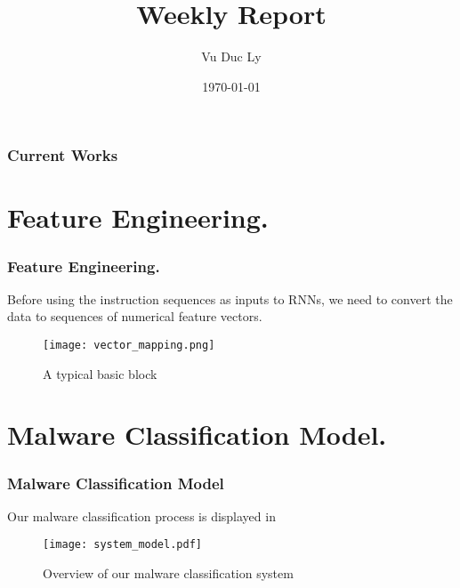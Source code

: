 \documentclass{beamer}
\title[Weekly Report]{Weekly Report } %
\author{Vu Duc Ly} %
\date{\today} %
\begin{document}
\begin{frame}
\titlepage %
\hyperlink{currentwork}{}
\end{frame}

\begin{frame}[label=currentwork]
\frametitle{Current Works} %
\tableofcontents %
\end{frame}


\section{Feature Engineering.} 
\begin{frame}[label=fe]
\frametitle{Feature Engineering.}
Before using the instruction sequences as inputs to RNNs, we need to convert the data to sequences of numerical feature vectors. 

\begin{figure}[!ht]
	\centering
	\texttt{[image: vector\_mapping.png]}
	\caption{A typical basic block}
	\label{fig:vector_mapping}
\end{figure}
\hyperlink{currentwork}{}
\hyperlink{model}{}
\end{frame}

\section{Malware Classification Model.} 
\begin{frame}[label=model]
\frametitle{Malware Classification Model}

Our malware classification process is displayed in 

\begin{figure}[!ht]
\centering
\texttt{[image: system\_model.pdf]}
\caption{Overview of our malware classification system }
\label{fig:system_model}
\end{figure}

 
\hyperlink{fe}{}
\hyperlink{plan}{}
\end{frame}
\end{document}
